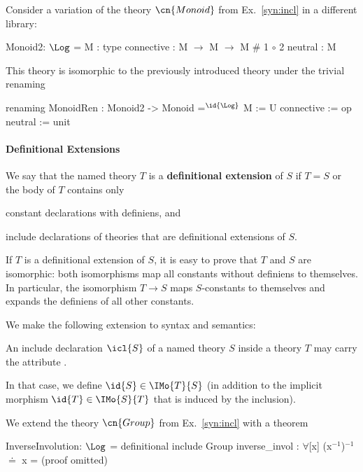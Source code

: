 \begin{example}[Renaming]
Consider a variation of the theory $\cn{Monoid}$ from Ex.~\ref{syn:incl} in a different library:
\begin{mmtcode}
Monoid2: $\Log$ =
  M          : type
  connective : M $\to$ M $\to$ M	 # 1 $\circ$ 2 
  neutral    : M
\end{mmtcode}
This theory is isomorphic to the previously introduced theory  under the trivial renaming
	\begin{mmtcode}
renaming MonoidRen : Monoid2 -> Monoid =$^{\id{\Log}}$
  M          := U
  connective := op 
  neutral    := unit
\end{mmtcode}
\end{example}

\paragraph{Definitional Extensions}
We say that the named theory $T$ is a \textbf{definitional extension} of $S$ if $T=S$ or the body of $T$ contains only
\begin{compactitem}
 \item constant declarations with definiens, and
 \item include declarations of theories that are definitional extensions of $S$.
\end{compactitem}

If $T$ is a definitional extension of $S$, it is easy to prove that $T$ and $S$ are isomorphic: both isomorphisms map all constants without definiens to themselves. In particular, the isomorphism $T\to S$ maps $S$-constants to themselves and expands the definiens of all other constants.

We make the following extension to syntax and semantics:
\begin{compactitem}
  \item An include declaration $\icl{S}$ of a named theory $S$ inside a theory $T$ may carry the attribute .
  \item In that case, we define $\id{S}\in\IMo{T}{S}$ (in addition to the implicit morphism $\id{T}\in\IMo{S}{T}$ that is induced by the inclusion).
\end{compactitem}

\begin{example}
We extend the theory $\cn{Group}$ from Ex.~\ref{syn:incl} with a theorem
\begin{mmtcode}
InverseInvolution: $\Log$ =
  definitional include Group
  inverse_invol : $\forall$[x] (x$^{-1}$)$^{-1}$$\doteq$ x  =  (proof omitted)
\end{mmtcode}
\end{example}

